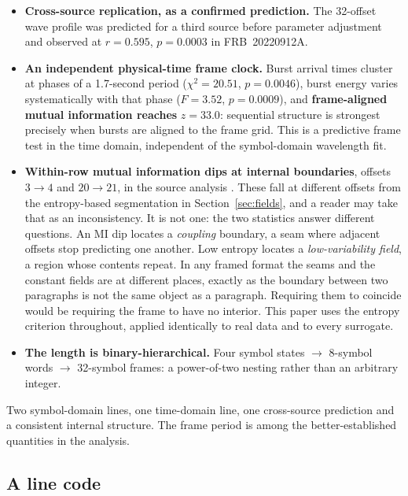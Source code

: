 \documentclass[11pt,a4paper]{article}
\begin{document}
\begin{itemize}[leftmargin=1.3em,itemsep=2pt]
\item \textbf{Cross-source replication, as a confirmed prediction.} The 32-offset wave
profile was predicted for a third source before parameter adjustment and observed at
$r = 0.595$, $p = 0.0003$ in FRB~20220912A.
\item \textbf{An independent physical-time frame clock.} Burst arrival times cluster at
phases of a 1.7-second period ($\chi^2 = 20.51$, $p = 0.0046$), burst energy varies
systematically with that phase ($F = 3.52$, $p = 0.0009$), and \textbf{frame-aligned
mutual information reaches} $z = \mathbf{33.0}$: sequential structure is strongest
precisely when bursts are aligned to the frame grid. This is a predictive frame test in
the time domain, independent of the symbol-domain wavelength fit.
\item \textbf{Within-row mutual information dips at internal boundaries},
offsets $3 \rightarrow 4$ and $20 \rightarrow 21$, in the source analysis
\cite{meucci2026}. These fall at different offsets from the entropy-based segmentation
in Section~\ref{sec:fields}, and a reader may take that as an inconsistency. It is not one: the two
statistics answer different questions. An MI dip locates a \emph{coupling} boundary,
a seam where adjacent offsets stop predicting one another. Low entropy locates a
\emph{low-variability field}, a region whose contents repeat. In any framed format the
seams and the constant fields are at different places, exactly as the boundary between
two paragraphs is not the same object as a paragraph. Requiring them to coincide would
be requiring the frame to have no interior. This paper uses the entropy criterion
throughout, applied identically to real data and to every surrogate.
\item \textbf{The length is binary-hierarchical.} Four symbol states $\rightarrow$
8-symbol words $\rightarrow$ 32-symbol frames: a power-of-two nesting rather than an
arbitrary integer.
\end{itemize}

Two symbol-domain lines, one time-domain line, one cross-source prediction and a
consistent internal structure. The frame period is among the better-established
quantities in the analysis.

\subsection{A line code}
\end{document}
